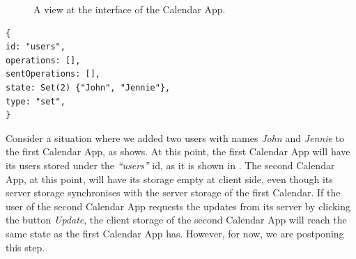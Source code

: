 \begin{figure}[!htb]
    \begin{center}
    \setlength{\fboxsep}{4pt}%
    \setlength{\fboxrule}{1pt}%
    {\scriptsize%
     }
    \caption {A view at the interface of the Calendar App.}
    \label{fig:ev-fig-2}
\end{center}
\end{figure}

\begin{lstlisting}[caption={The state of the users object store at the first Calendar App.}, label={lst:ev3}]
{
id: "users",
operations: [],
sentOperations: [],
state: Set(2) {"John", "Jennie"},
type: "set",
}
\end{lstlisting}

Consider a situation where we added two users with names \textit{John} and \textit{Jennie} to the first Calendar App, as  shows. At this point, the first Calendar App will have its users stored under the \textit{``users''} id, as it is shown in . The second Calendar App, at this point, will have its storage empty at client side, even though its server storage synchronises with the server storage of the first Calendar. If the user of the second Calendar App requests the updates from its server by clicking the button \textit{Update}, the client storage of the second Calendar App will reach the same state as the first Calendar App has. However, for now, we are postponing this step.

